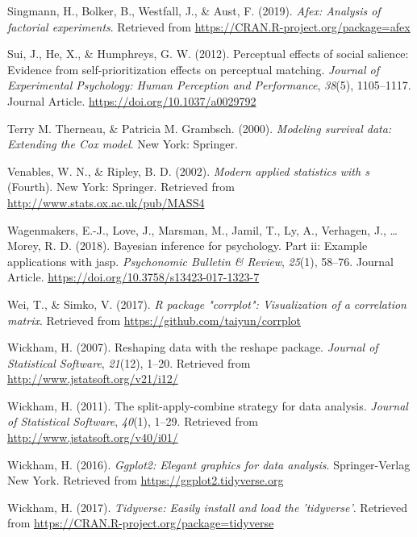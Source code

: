 \documentclass[man]{apa6}
\begin{document}
\leavevmode\hypertarget{ref-R-afex}{}%
Singmann, H., Bolker, B., Westfall, J., \& Aust, F. (2019). \emph{Afex: Analysis of factorial experiments}. Retrieved from \url{https://CRAN.R-project.org/package=afex}

\leavevmode\hypertarget{ref-Sui_2012_JEPHPP}{}%
Sui, J., He, X., \& Humphreys, G. W. (2012). Perceptual effects of social salience: Evidence from self-prioritization effects on perceptual matching. \emph{Journal of Experimental Psychology: Human Perception and Performance}, \emph{38}(5), 1105--1117. Journal Article. \url{https://doi.org/10.1037/a0029792}

\leavevmode\hypertarget{ref-R-survival-book}{}%
Terry M. Therneau, \& Patricia M. Grambsch. (2000). \emph{Modeling survival data: Extending the Cox model}. New York: Springer.

\leavevmode\hypertarget{ref-R-MASS}{}%
Venables, W. N., \& Ripley, B. D. (2002). \emph{Modern applied statistics with s} (Fourth). New York: Springer. Retrieved from \url{http://www.stats.ox.ac.uk/pub/MASS4}

\leavevmode\hypertarget{ref-Wagenmakers_2018_JASP}{}%
Wagenmakers, E.-J., Love, J., Marsman, M., Jamil, T., Ly, A., Verhagen, J., \ldots{} Morey, R. D. (2018). Bayesian inference for psychology. Part ii: Example applications with jasp. \emph{Psychonomic Bulletin \& Review}, \emph{25}(1), 58--76. Journal Article. \url{https://doi.org/10.3758/s13423-017-1323-7}

\leavevmode\hypertarget{ref-R-corrplot2017}{}%
Wei, T., \& Simko, V. (2017). \emph{R package "corrplot": Visualization of a correlation matrix}. Retrieved from \url{https://github.com/taiyun/corrplot}

\leavevmode\hypertarget{ref-R-reshape2}{}%
Wickham, H. (2007). Reshaping data with the reshape package. \emph{Journal of Statistical Software}, \emph{21}(12), 1--20. Retrieved from \url{http://www.jstatsoft.org/v21/i12/}

\leavevmode\hypertarget{ref-R-plyr}{}%
Wickham, H. (2011). The split-apply-combine strategy for data analysis. \emph{Journal of Statistical Software}, \emph{40}(1), 1--29. Retrieved from \url{http://www.jstatsoft.org/v40/i01/}

\leavevmode\hypertarget{ref-R-ggplot2}{}%
Wickham, H. (2016). \emph{Ggplot2: Elegant graphics for data analysis}. Springer-Verlag New York. Retrieved from \url{https://ggplot2.tidyverse.org}

\leavevmode\hypertarget{ref-R-tidyverse}{}%
Wickham, H. (2017). \emph{Tidyverse: Easily install and load the 'tidyverse'}. Retrieved from \url{https://CRAN.R-project.org/package=tidyverse}
\end{document}
